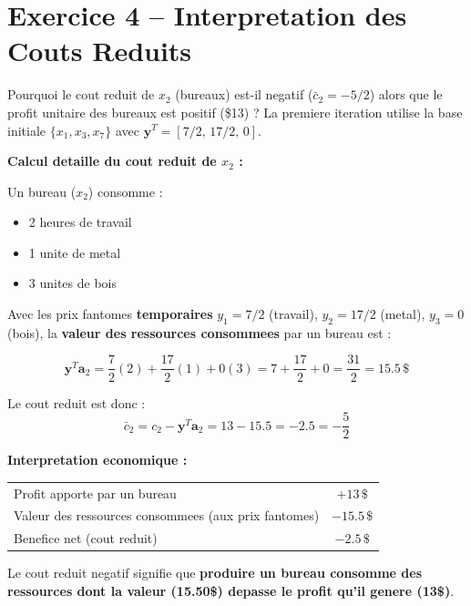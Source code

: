 \documentclass[12pt,a4paper]{article}
\begin{document}
\newpage
\section{Exercice 4 -- Interpretation des Couts Reduits}

\begin{enonce}
Pourquoi le cout reduit de $x_2$ (bureaux) est-il negatif ($\bar{c}_2 = -5/2$) alors que le profit unitaire des bureaux est positif (\$13) ? La premiere iteration utilise la base initiale $\{x_1, x_3, x_7\}$ avec $\mathbf{y}^T = [7/2,\, 17/2,\, 0]$.
\end{enonce}

\begin{correction}
\textbf{Calcul detaille du cout reduit de $x_2$ :}

Un bureau ($x_2$) consomme :
\begin{itemize}
    \item 2 heures de travail
    \item 1 unite de metal
    \item 3 unites de bois
\end{itemize}

Avec les prix fantomes \textbf{temporaires} $y_1 = 7/2$ (travail), $y_2 = 17/2$ (metal), $y_3 = 0$ (bois), la \textbf{valeur des ressources consommees} par un bureau est :

$$\mathbf{y}^T \mathbf{a}_2 = \frac{7}{2}(2) + \frac{17}{2}(1) + 0(3) = 7 + \frac{17}{2} + 0 = \frac{31}{2} = 15.5 \, \$$$

Le cout reduit est donc :
$$\bar{c}_2 = c_2 - \mathbf{y}^T \mathbf{a}_2 = 13 - 15.5 = -2.5 = -\frac{5}{2}$$

\textbf{Interpretation economique :}

\begin{center}
\begin{tabular}{l|c}
\toprule
Profit apporte par un bureau & $+13\,\$$ \\
Valeur des ressources consommees (aux prix fantomes) & $-15.5\,\$$ \\
\midrule
Benefice net (cout reduit) & $-2.5\,\$$ \\
\bottomrule
\end{tabular}
\end{center}

Le cout reduit negatif signifie que \textcolor{importantrouge}{\textbf{produire un bureau consomme des ressources dont la valeur (15.50\$) depasse le profit qu'il genere (13\$)}}.


\end{correction}
\end{document}
